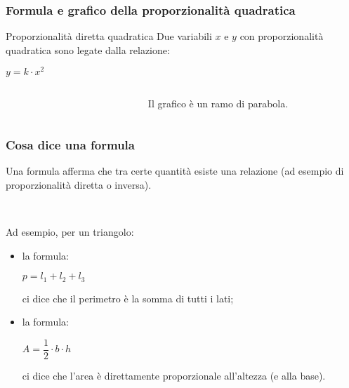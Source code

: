 \documentclass[]{beamer}
\begin{document}
\begin{frame}
\frametitle{Formula e grafico della proporzionalità quadratica}
\begin{block}{Proporzionalità diretta quadratica}
Due variabili $ x $ e $ y $ con proporzionalità quadratica sono legate dalla relazione:
\begin{center}
\colorbox{blue!30}{$ y = k \cdot x^2 $}
\end{center}\pause
\end{block}

\begin{columns}
\begin{column}{0.4\textwidth}
\begin{figure}\centering
{}
\end{figure}
\end{column}
\begin{column}{0.4\textwidth}
Il grafico è un \alert{ramo di parabola}.
\end{column}
\end{columns}
\end{frame}



\begin{frame}
\frametitle{Cosa dice una formula}
Una formula afferma che \alert{tra certe quantità esiste una relazione} (ad esempio di proporzionalità diretta o inversa).\pause

~

Ad esempio, per un triangolo:
\begin{itemize}
  \item la formula: \begin{center}
  $ p = l_1 + l_2 + l_3 $
  \end{center}
  ci dice che il perimetro è la somma di tutti i lati;\pause
  \item la formula:\begin{center}
  $ A = \dfrac{1}{2} \cdot b \cdot h $
  \end{center} ci dice che l'area è direttamente proporzionale all'altezza (e alla base).
\end{itemize}
\end{frame}
\end{document}
